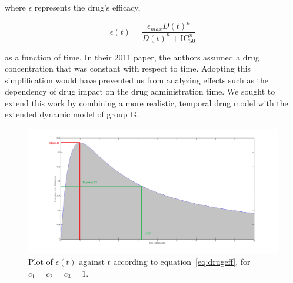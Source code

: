 \documentclass[a4paper, 12pt]{report}
\begin{document}
where $\epsilon$ represents the drug's efficacy,

\begin{equation}
\epsilon(t) = \frac{\epsilon_{max}D(t)^{n}}{D(t)^{n}+\mathrm{IC}^{n}_{50}}
\end{equation}

as a function of time.
In their 2011 paper, the authors assumed a drug concentration that was constant with respect to time. Adopting this simplification would have prevented us from analyzing effects such as the dependency of drug impact on the drug administration time.
We sought to extend this work by combining a more realistic, temporal drug model with the extended dynamic model of group G.\cite{Group G}

\begin{figure}[htb]
\begin{centering}
\includegraphics[width=150mm]{DrugProfile.png}
\caption{Plot of $\epsilon(t)$ against $t$ according to equation~\eqref{eq:drugeff}, for $c_1 = c_2 = c_3 = 1$.}
\label{fig:DrugProfile}
\end{centering}
\end{figure}
\end{document}
